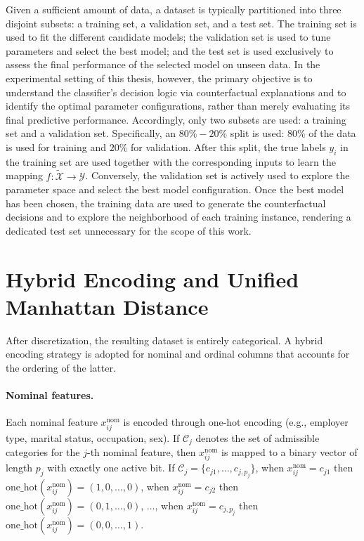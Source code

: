 Given a sufficient amount of data, a dataset is typically partitioned into three disjoint subsets: a training set, a validation set, and a test set. The training set is used to fit the different candidate models; the validation set is used to tune parameters and select the best model; and the test set is used exclusively to assess the final performance of the selected model on unseen data. In the experimental setting of this thesis, however, the primary objective is to understand the classifier's decision logic via counterfactual explanations and to identify the optimal parameter configurations, rather than merely evaluating its final predictive performance. Accordingly, only two subsets are used: a training set and a validation set. Specifically, an $80\%-20\%$ split is used: $80\%$ of the data is used for training and $20\%$ for validation. After this split, the true labels $y_i$ in the training set are used together with the corresponding inputs to learn the mapping $f: \widetilde{\mathcal{X}} \rightarrow \mathcal{Y}$. Conversely, the validation set is actively used to explore the parameter space and select the best model configuration. Once the best model has been chosen, the training data are used to generate the counterfactual decisions and to explore the neighborhood of each training instance, rendering a dedicated test set unnecessary for the scope of this work.

\section{Hybrid Encoding and Unified Manhattan Distance}
\label{sec:hybrid-encoding-distance}

After discretization, the resulting dataset is entirely categorical. A hybrid encoding strategy is adopted for nominal and ordinal columns that accounts for the ordering of the latter.

\paragraph{Nominal features.} Each nominal feature $x^{\mathrm{nom}}_{ij}$ is encoded through one-hot encoding (e.g., employer type, marital status, occupation, sex). If $\mathcal{C}_j$ denotes the set of admissible categories for the $j$-th nominal feature, then $x^{\mathrm{nom}}_{ij}$ is mapped to a binary vector of length $p_j$ with exactly one active bit. If $\mathcal{C}_j = \{c_{j1},\ldots,c_{j,p_j}\}$, when $x^{\mathrm{nom}}_{ij} = c_{j1}$ then $\mathrm{one\_hot}(x^{\mathrm{nom}}_{ij}) = (1,0,\dots,0)$, when $x^{\mathrm{nom}}_{ij} = c_{j2}$ then $\mathrm{one\_hot}(x^{\mathrm{nom}}_{ij}) = (0,1,\dots,0)$, $\dots$, when $x^{\mathrm{nom}}_{ij} = c_{j,p_j}$ then $\mathrm{one\_hot}(x^{\mathrm{nom}}_{ij}) = (0,0,\dots,1)$.

